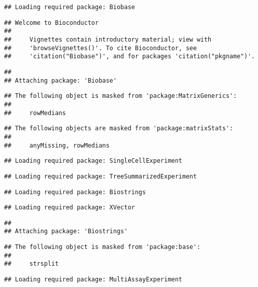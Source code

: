\documentclass[
  oneside]{book}
\begin{document}
\begin{verbatim}
## Loading required package: Biobase
\end{verbatim}

\begin{verbatim}
## Welcome to Bioconductor
## 
##     Vignettes contain introductory material; view with
##     'browseVignettes()'. To cite Bioconductor, see
##     'citation("Biobase")', and for packages 'citation("pkgname")'.
\end{verbatim}

\begin{verbatim}
## 
## Attaching package: 'Biobase'
\end{verbatim}

\begin{verbatim}
## The following object is masked from 'package:MatrixGenerics':
## 
##     rowMedians
\end{verbatim}

\begin{verbatim}
## The following objects are masked from 'package:matrixStats':
## 
##     anyMissing, rowMedians
\end{verbatim}

\begin{verbatim}
## Loading required package: SingleCellExperiment
\end{verbatim}

\begin{verbatim}
## Loading required package: TreeSummarizedExperiment
\end{verbatim}

\begin{verbatim}
## Loading required package: Biostrings
\end{verbatim}

\begin{verbatim}
## Loading required package: XVector
\end{verbatim}

\begin{verbatim}
## 
## Attaching package: 'Biostrings'
\end{verbatim}

\begin{verbatim}
## The following object is masked from 'package:base':
## 
##     strsplit
\end{verbatim}

\begin{verbatim}
## Loading required package: MultiAssayExperiment
\end{verbatim}
\end{document}

